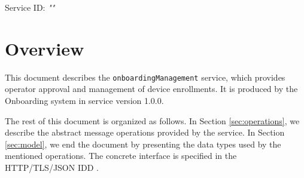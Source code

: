 \documentclass[a4paper]{arrowhead}
\begin{document}
\sloppy

\ArrowheadSetup

\begin{center}
  \vspace*{1cm}
  \huge{\arrowtitle}

  \vspace*{0.2cm}
  \LARGE{\arrowtype}
  \vspace*{1cm}

  \Large{Service ID: \textit{"\arrowid"}}

  \vspace*{\fill}


  \vspace*{1cm}
  \vspace*{\fill}

  \begin{abstract}
    This document describes the \texttt{onboarding\allowbreak{}Management} service, version 1.0.0, produced by the Onboarding support system of Arrowhead 5.2.2.
  \end{abstract}

  \vspace*{1cm}
\end{center}

\newpage

\tableofcontents
\newpage

\section{Overview}
\label{sec:overview}

This document describes the \texttt{onboarding\allowbreak{}Management} service, which provides operator approval and management of device enrollments.
It is produced by the Onboarding system \cite{onb-sysd} in service version 1.0.0.

The rest of this document is organized as follows.
In Section \ref{sec:operations}, we describe the abstract message operations provided by the service.
In Section \ref{sec:model}, we end the document by presenting the data types used by the mentioned operations.
The concrete interface is specified in the HTTP/TLS/JSON IDD \cite{onb-onboardingManagement-http-idd}.
\end{document}
